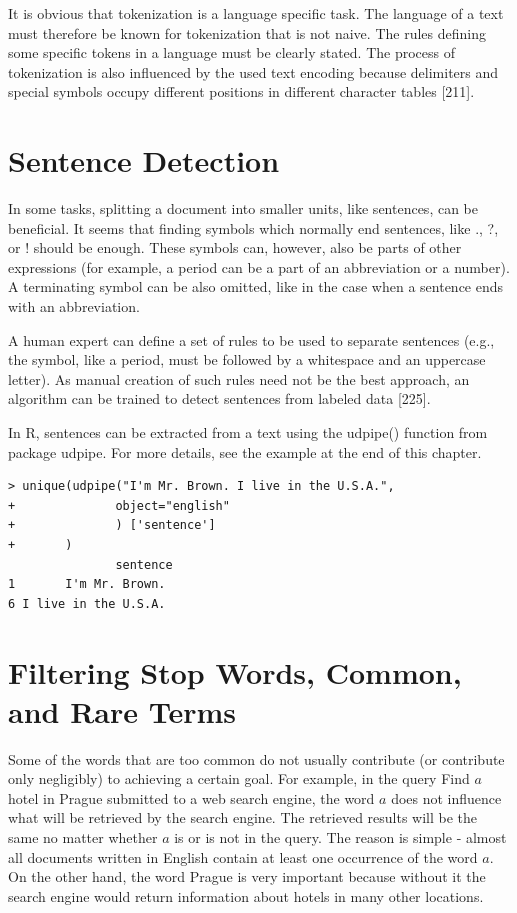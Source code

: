 \documentclass[11pt,openany,executivepaper]{book}
\begin{document}
It is obvious that tokenization is a language specific task. The language of a text must therefore be known for tokenization that is not naive. The rules defining some specific tokens in a language must be clearly stated. The process of tokenization is also influenced by the used text encoding because delimiters and special symbols occupy different positions in different character tables [211].

\section{Sentence Detection}
In some tasks, splitting a document into smaller units, like sentences, can be beneficial. It seems that finding symbols which normally end sentences, like ., ?, or ! should be enough. These symbols can, however, also be parts of other expressions (for example, a period can be a part of an abbreviation or a number). A terminating symbol can be also omitted, like in the case when a sentence ends with an abbreviation.

A human expert can define a set of rules to be used to separate sentences (e.g., the symbol, like a period, must be followed by a whitespace and an uppercase letter). As manual creation of such rules need not be the best approach, an algorithm can be trained to detect sentences from labeled data [225].

In R, sentences can be extracted from a text using the udpipe() function from package udpipe. For more details, see the example at the end of this chapter.

\begin{verbatim}
> unique(udpipe("I'm Mr. Brown. I live in the U.S.A.",
+              object="english"
+              ) ['sentence']
+       )
               sentence
1       I'm Mr. Brown.
6 I live in the U.S.A.
\end{verbatim}

\section{Filtering Stop Words, Common, and Rare Te\-rms}
Some of the words that are too common do not usually contribute (or contribute only negligibly) to achieving a certain goal. For example, in the query Find $a$ hotel in Prague submitted to a web search engine, the word $a$ does not influence what will be retrieved by the search engine. The retrieved results will be the same no matter whether $a$ is or is not in the query. The reason is simple - almost all documents written in English contain at least one occurrence of the word $a$. On the other hand, the word Prague is very important because without it the search engine would return information about hotels in many other locations.
\end{document}
